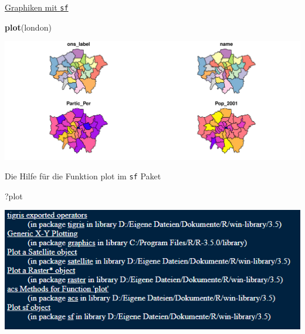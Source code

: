\documentclass[ignorenonframetext,]{beamer}
\newenvironment{Shaded}{\begin{snugshade}}{\end{snugshade}}
\newcommand{\KeywordTok}[1]{\textcolor[rgb]{0.13,0.29,0.53}{\textbf{#1}}}
\newcommand{\NormalTok}[1]{#1}
\begin{document}
\begin{frame}[fragile]{\href{https://r-spatial.github.io/sf/articles/sf5.html}{Graphiken
mit \texttt{sf}}}
\protect\hypertarget{graphiken-mit-sf}{}

\begin{Shaded}
\begin{Highlighting}[]
\KeywordTok{plot}\NormalTok{(london)}
\end{Highlighting}
\end{Shaded}

\includegraphics{B7_simplefeatures_files/figure-beamer/unnamed-chunk-7-1.pdf}

\end{frame}

\begin{frame}[fragile]{Die Hilfe für die Funktion plot im \texttt{sf}
Paket}
\protect\hypertarget{die-hilfe-fur-die-funktion-plot-im-sf-paket}{}

\begin{Shaded}
\begin{Highlighting}[]
\NormalTok{?plot}
\end{Highlighting}
\end{Shaded}

\includegraphics{figure/fragezeichen_plot.PNG}

\end{frame}
\end{document}
